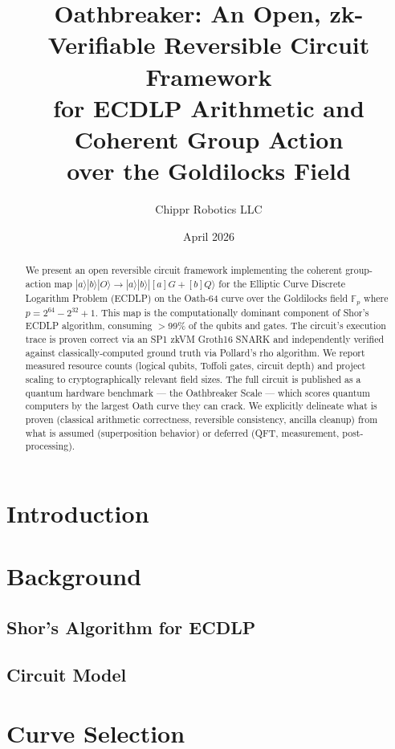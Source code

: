 \documentclass[11pt]{article}
\title{Oathbreaker: An Open, zk-Verifiable Reversible Circuit Framework\\for ECDLP Arithmetic and Coherent Group Action\\over the Goldilocks Field}
\author{Chippr Robotics LLC}
\date{April 2026}
\begin{document}
\maketitle

\begin{abstract}
We present an open reversible circuit framework implementing the coherent
group-action map $|a\rangle|b\rangle|O\rangle \to |a\rangle|b\rangle|[a]G + [b]Q\rangle$
for the Elliptic Curve Discrete Logarithm Problem (ECDLP) on the Oath-64 curve
over the Goldilocks field $\mathbb{F}_p$ where $p = 2^{64} - 2^{32} + 1$.
This map is the computationally dominant component of Shor's ECDLP algorithm,
consuming $>$99\% of the qubits and gates.
The circuit's execution trace is proven correct via an SP1 zkVM Groth16 SNARK
and independently verified against classically-computed ground truth via
Pollard's rho algorithm. We report measured resource counts (logical qubits,
Toffoli gates, circuit depth) and project scaling to cryptographically relevant
field sizes. The full circuit is published as a quantum hardware benchmark ---
the Oathbreaker Scale --- which scores quantum computers by the largest Oath
curve they can crack. We explicitly delineate what is proven (classical
arithmetic correctness, reversible consistency, ancilla cleanup) from what is
assumed (superposition behavior) or deferred (QFT, measurement, post-processing).
\end{abstract}

\section{Introduction}


\section{Background}

\subsection{Shor's Algorithm for ECDLP}

\subsection{Circuit Model}

\section{Curve Selection}
\end{document}
